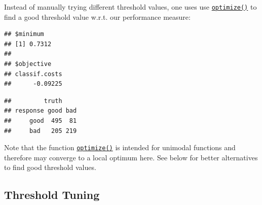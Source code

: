 \documentclass[
]{scrbook}
\newenvironment{Shaded}{\begin{snugshade}}{\end{snugshade}}
\newcommand{\CommentTok}[1]{\textcolor[rgb]{0.56,0.35,0.01}{\textit{#1}}}
\newcommand{\ControlFlowTok}[1]{\textcolor[rgb]{0.13,0.29,0.53}{\textbf{#1}}}
\newcommand{\DecValTok}[1]{\textcolor[rgb]{0.00,0.00,0.81}{#1}}
\newcommand{\FloatTok}[1]{\textcolor[rgb]{0.00,0.00,0.81}{#1}}
\newcommand{\FunctionTok}[1]{\textcolor[rgb]{0.00,0.00,0.00}{#1}}
\newcommand{\NormalTok}[1]{#1}
\newcommand{\OtherTok}[1]{\textcolor[rgb]{0.56,0.35,0.01}{#1}}
\newcommand{\SpecialCharTok}[1]{\textcolor[rgb]{0.00,0.00,0.00}{#1}}
\renewenvironment{Shaded} {\begin{snugshade}\small} {\end{snugshade}}
\begin{document}
Instead of manually trying different threshold values, one uses use \href{https://www.rdocumentation.org/packages/stats/topics/optimize}{\texttt{optimize()}} to find a good threshold value w.r.t. our performance measure:

\begin{Shaded}
\end{Shaded}

\begin{verbatim}
## $minimum
## [1] 0.7312
## 
## $objective
## classif.costs 
##      -0.09225
\end{verbatim}

\begin{Shaded}
\end{Shaded}

\begin{verbatim}
##         truth
## response good bad
##     good  495  81
##     bad   205 219
\end{verbatim}

Note that the function \href{https://www.rdocumentation.org/packages/stats/topics/optimize}{\texttt{optimize()}} is intended for unimodal functions and therefore may converge to a local optimum here.
See below for better alternatives to find good threshold values.

\hypertarget{threshold-tuning-1}{%
\subsection{Threshold Tuning}\label{threshold-tuning-1}}
\end{document}
